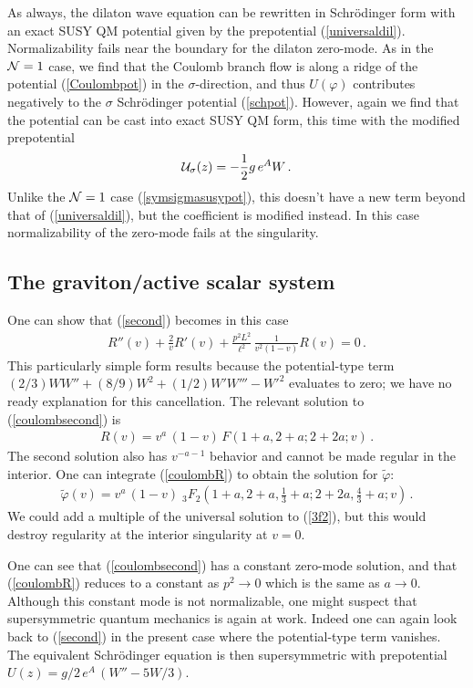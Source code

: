\documentclass[a4paper,12pt]{article}
\def\varphit{\tilde{\varphi}}
\begin{document}
As always, the dilaton wave equation can be rewritten in Schr\"odinger
form with an exact SUSY QM potential given by the prepotential
(\ref{universaldil}).  Normalizability fails near the boundary for
the dilaton zero-mode. As in the ${\cal N}=1$ case, we find that the
Coulomb branch flow is along a ridge of the potential (\ref{Coulombpot})
in the $\sigma$-direction, and
thus $U(\varphi)$ contributes negatively to the $\sigma$ Schr\"odinger
potential (\ref{schpot}).  However, again we find that the potential
can be cast into exact SUSY QM form, this time with the modified
prepotential
\begin{eqnarray}
{\cal U}_{\sigma}(z) = - \frac{1}{2} g \, e^{A} W \,.
\end{eqnarray}
Unlike the ${\cal N}=1$ case (\ref{symsigmasusypot}), this doesn't
have a new term beyond that of (\ref{universaldil}), but the
coefficient is modified instead.  In this case normalizability of
the zero-mode fails at the singularity.


\subsection{The graviton/active scalar system}
\label{coulombactive}

One can show that (\ref{second}) becomes in this case
\begin{eqnarray}
\label{coulombsecond}
R''(v) + \frac{2}{v} R'(v) + \frac{p^2 L^2}{\ell^2} \,
\frac{1}{v^2(1-v)} R(v) = 0 \,.
\end{eqnarray}
This particularly simple form results because the potential-type term
$(2/3) W W'' + (8/9) W^2 + (1/2) W' W''' - W'^2$ evaluates to zero; we
have no ready explanation for this cancellation. The relevant solution
to (\ref{coulombsecond}) is
\begin{eqnarray}
\label{coulombR}
R(v) = v^a \, (1-v) \, F \left( 1+a, 2+a; 2+2a; v \right) \,.
\end{eqnarray}
The second solution also has $v^{-a-1}$ behavior and cannot be made
regular in the interior.  One can integrate (\ref{coulombR}) to obtain the
solution for $\varphit$:
\begin{eqnarray}
\label{3f2}
\varphit(v) = v^a \, (1-v) \; _3F_2 \left( 1+a, 2+a, \frac{1}{3} +a; 2+2a,
\frac{4}{3} +a; v \right) \,.
\end{eqnarray}
We could add a multiple of the universal solution to (\ref{3f2}), but this
would destroy regularity at the interior singularity at $v=0$.

One can see that (\ref{coulombsecond}) has a constant zero-mode solution,
and that (\ref{coulombR}) reduces to a constant as $p^2 \rightarrow 0$ which is
the same as $a \rightarrow 0$. Although this constant mode is not
normalizable,
one might suspect that supersymmetric quantum mechanics is again at work.
Indeed one can again look back to (\ref{second}) in the present case where
the
potential-type term vanishes. The equivalent Schr\"odinger equation is then
supersymmetric with prepotential $U(z) = g/2 \, e^A \, (W''- 5W/3)$.
 
\end{document}
